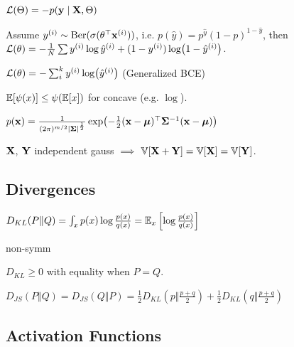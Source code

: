 \begin{definition}[NLL]
    \(\mathcal{L}(\Theta) = - p(\vb{y} \mid \vb{X}, \Theta)\)
\end{definition}

\begin{definition}[BCE]
    Assume \(y^{(i)} \sim \operatorname{Ber}(\sigma(\theta^\top \vb{x}^{(i)}))\), i.e. \(p(\hat y) = p^{\hat y}(1 - p)^{1 - \hat y}\), then \(\mathcal{L}(\theta) = - \frac 1 N \sum y^{(i)} \log \hat y^{(i)} + ( 1 - y^{(i)}) \log(1 - \hat y^{(i)})\).
\end{definition}

\begin{definition}
    \(\mathcal{L}(\theta) = - \sum_i^k y^{(i)} \log (\hat y^{(i)})\) (Generalized BCE)
\end{definition}

\begin{definition}
    \(\mathbb{E}[\psi(x)] \leq \psi(\mathbb{E}[x])\) for concave (e.g. \(\log\)).
\end{definition}

\begin{definition}[Gauss]
    \(p(\vb{x}) = \frac{1}{(2\pi)^{m/2} \vert \vb*{\Sigma} \vert^{\frac 1 2}} \exp(-\frac 1 2 (\vb{x} - \vb*{\mu})^\top \vb*{\Sigma}^{-1} (\vb{x} - \vb*{\mu}))\)

    \(\vb{X}\), \(\vb{Y}\) independent gauss \(\implies\) \(\operatorname{\mathbb{V}}[\vb{X} + \vb{Y}] = \operatorname{\mathbb{V}}[\vb{X}] = \operatorname{\mathbb{V}}[\vb{Y}]\).
\end{definition}

\subsection{Divergences}

    \(D_{KL}(P \Vert Q) = \int_x p(x) \log \frac{p(x)}{q(x)} = \mathbb{E}_x\left[\log\frac{p(x)}{q(x)}\right]\)

    \begin{itemize*}
        \item non-symm
        \item \(D_{KL} \geq 0\) with equality when \(P = Q\).
    \end{itemize*}

    \(D_{JS}(P \Vert Q) = D_{JS}(Q \Vert P) = \frac 1 2 D_{KL}(p \Vert \frac{p+q}{2})+ \frac 1 2 D_{KL}(q \Vert \frac{p + q}{2})\)

\subsection{Activation Functions}

